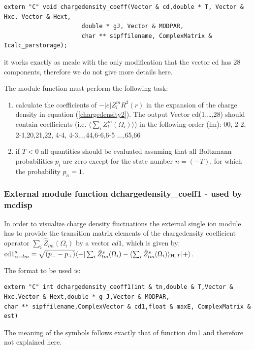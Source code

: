 \begin{verbatim}
extern "C" void chargedensity_coeff(Vector & cd,double * T, Vector & Hxc, Vector & Hext,
                      double * gJ, Vector & MODPAR,
                      char ** sipffilename, ComplexMatrix & Icalc_parstorage);
\end{verbatim}

it works exactly as {\prg mcalc} with the only modification
that the vector cd has 28 components, therefore we do not give more details here.

The module function must perform the following task:
\begin{enumerate}
\item calculate the coefficients of $-|e|Z_l^m R^2(r)$ in the expansion of
      the charge density in equation (\ref{chargedensity2}).
      The output Vector cd(1,\dots,28) should contain  coefficients 
     (i.e. $\langle\sum_i Z_l^m (\Omega_i)\rangle$)
      in the following order (lm):  00, 2-2, 2-1,20,21,22, 4-4, 4-3,..,44,6-6,6-5 ...,65,66
\item if $T<0$ all quantities should be evaluated assuming that all Boltzmann probabilities $p_i$
 are zero except for the state number $n=(-T)$, for which the probability $p_n=1$.
\end{enumerate}


\subsubsection{External module function {\prg dchargedensity\_coeff1} - used by {\prg mcdisp}}

In order to visualize charge density  fluctuations 
 the external single ion module has to provide the transition
matrix elements of the chargedensity coefficient operator $\sum_i \hat Z_{lm}(\Omega_i)$ by a
vector $cd1$, which is given by:
 ${\rm cd1}^s_{\alpha=lm}=\sqrt{(p_--p_+)}\langle -|\sum_i \hat  Z^s_{lm}(\Omega_i)-\langle \sum_i\hat  Z^s_{lm}(\Omega_i)\rangle_{\mathbf H,T}|+\rangle$. 

The format to be used is:
{\footnotesize
\begin{verbatim}
extern "C" int dchargedensity_ceoff1(int & tn,double & T,Vector & Hxc,Vector & Hext,double * g_J,Vector & MODPAR,
char ** sipffilename,ComplexVector & cd1,float & maxE, ComplexMatrix & est)
\end{verbatim}
}
The meaning of the symbols follows exactly that of function 
{\prg dm1} and therefore not explained here.


